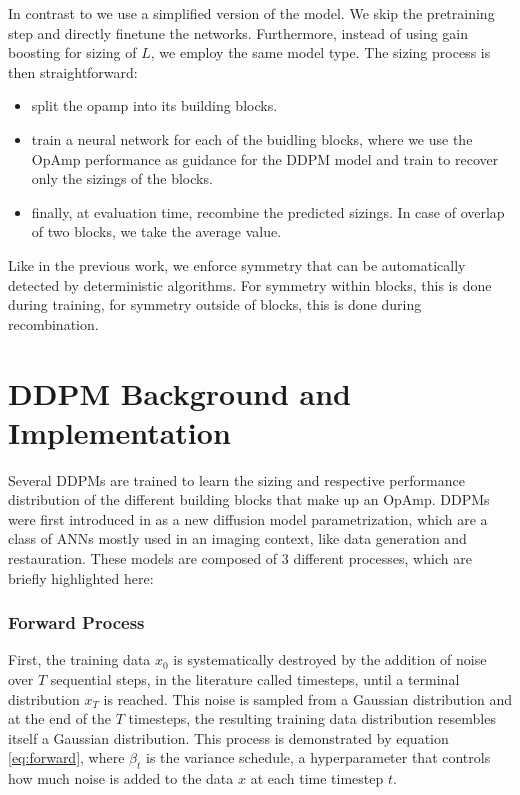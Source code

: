 \documentclass[conference]{IEEEtran}
\begin{document}
	In contrast to \cite{ leibl24inverse} we use a simplified version of the model. We skip the pretraining step and directly finetune the networks. Furthermore, instead of using gain boosting for sizing of $L$, we employ the same model type.
	The sizing process is then straightforward:
	\begin{itemize}
	\item split the opamp into its building blocks.
	\item train a neural network for each of the buidling blocks, where we use the OpAmp performance as guidance for the DDPM model and train to recover only the sizings of the blocks.
	\item finally, at evaluation time, recombine the predicted sizings. In case of overlap of two blocks, we take the average value.
	\end{itemize}

	Like in the previous work, we enforce symmetry that can be automatically detected by deterministic algorithms. For symmetry within blocks, this is done during training, for symmetry outside of blocks, this is done during recombination.
			

	
\section{DDPM Background and Implementation}\label{sec:ddpm}
	Several DDPMs are trained to learn the sizing and respective performance distribution of the different building blocks that make up an OpAmp. DDPMs were first introduced in \cite{ho2020denoisingdiffusionprobabilisticmodels} as a new diffusion model parametrization, which are a class of ANNs mostly used in an imaging context, like data generation and restauration. These models are composed of 3 different processes, which are briefly highlighted here:
	
	\subsubsection{Forward Process}
	First, the training data $x_{0}$ is systematically destroyed by the addition of noise over $T$ sequential steps, in the literature called timesteps, until a terminal distribution $x_{T}$ is reached. This noise is sampled from a Gaussian distribution and at the end of the $T$ timesteps, the resulting training data distribution resembles itself a Gaussian distribution. %
	This process is demonstrated by equation \ref{eq:forward}, where $\beta_{t}$ is the variance schedule, a hyperparameter that controls how much noise is added to the data $x$ at each time timestep $t$.
	
\end{document}

